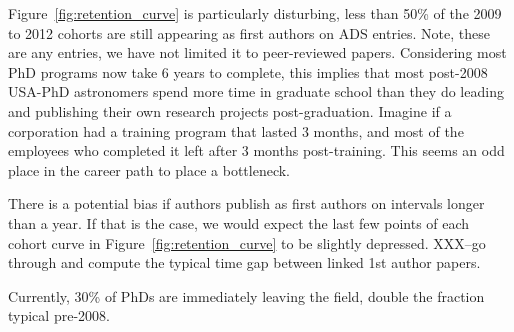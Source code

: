 \documentclass[preprint2]{aastex}
\begin{document}




Figure~\ref{fig:retention_curve} is particularly disturbing, less than 50\% of the 2009 to 2012 cohorts are still appearing as first authors on ADS entries. Note, these are any entries, we have not limited it to peer-reviewed papers.  Considering most PhD programs now take 6 years to complete, this implies that most post-2008 USA-PhD astronomers spend more time in graduate school than they do leading and publishing their own research projects post-graduation. Imagine if a corporation had a training program that lasted 3 months, and most of the employees who completed it left after 3 months post-training.  This seems an odd place in the career path to place a bottleneck.

There is a potential bias if authors publish as first authors on intervals longer than a year.  If that is the case, we would expect the last few points of each cohort curve in Figure~\ref{fig:retention_curve} to be slightly depressed.  XXX--go through and compute the typical time gap between linked 1st author papers.  

Currently, 30\% of PhDs are immediately leaving the field, double the fraction typical pre-2008.  

\end{document}
